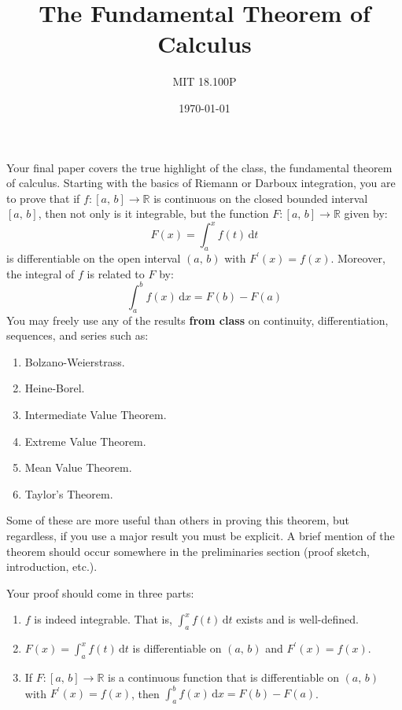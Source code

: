 \documentclass{article}
\title{The Fundamental Theorem of Calculus}
\author{MIT 18.100P}
\date{\today}
\begin{document}
    \maketitle
    Your final paper covers the true highlight of the class, the fundamental
    theorem of calculus. Starting with the basics of Riemann or Darboux
    integration, you are to prove that if $f:[a,\,b]\rightarrow\mathbb{R}$
    is continuous on the closed bounded interval $[a,\,b]$,
    then not only is it integrable, but the function
    $F:[a,\,b]\rightarrow\mathbb{R}$ given by:
    \begin{equation}
        F(x)=\int_{a}^{x}f(t)\,\textrm{d}t
    \end{equation}
    is differentiable on the open interval $(a,\,b)$ with
    $F^{\prime}(x)=f(x)$. Moreover, the integral of $f$ is related to $F$
    by:
    \begin{equation}
        \int_{a}^{b}f(x)\,\textrm{d}x=F(b)-F(a)
    \end{equation}
    You may freely use any of the results \textbf{from class} on continuity,
    differentiation, sequences, and series such as:
    \begin{enumerate}
        \item
            Bolzano-Weierstrass.
        \item
            Heine-Borel.
        \item
            Intermediate Value Theorem.
        \item
            Extreme Value Theorem.
        \item
            Mean Value Theorem.
        \item
            Taylor's Theorem.
    \end{enumerate}
    Some of these are more useful than others in proving this theorem,
    but regardless, if you use a major result you must be explicit.
    A brief mention of the theorem should occur somewhere in the
    preliminaries section (proof sketch, introduction, etc.).
    \par\hfill\par
    Your proof should come in three parts:
    \begin{enumerate}
        \item
            $f$ is indeed integrable. That is, $\int_{a}^{x}f(t)\,\textrm{d}t$
            exists and is well-defined.
        \item
            $F(x)=\int_{a}^{x}f(t)\,\textrm{d}t$ is differentiable on $(a,\,b)$
            and $F^{\prime}(x)=f(x)$.
        \item
            If $F:[a,\,b]\rightarrow\mathbb{R}$ is a continuous function that
            is differentiable on $(a,\,b)$ with $F^{\prime}(x)=f(x)$, then
            $\int_{a}^{b}f(x)\,\textrm{d}x=F(b)-F(a)$.
    \end{enumerate}
\end{document}
